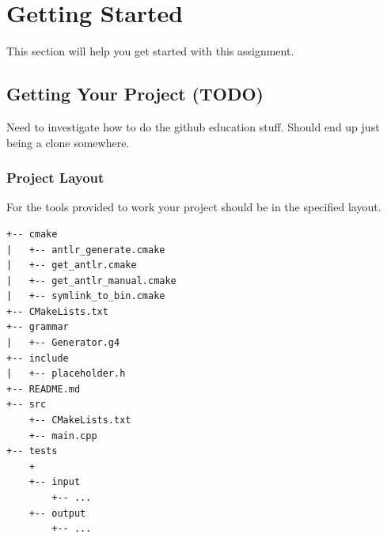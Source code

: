 \documentclass{article}
\begin{document}
\section{Getting Started}
This section will help you get started with this assignment.

\subsection{Getting Your Project (TODO)}
Need to investigate how to do the github education stuff. Should end up just being a clone
somewhere.

\subsubsection{Project Layout}
For the tools provided to work your project should be in the specified layout.
\begin{lstlisting}
+-- cmake
|   +-- antlr_generate.cmake
|   +-- get_antlr.cmake
|   +-- get_antlr_manual.cmake
|   +-- symlink_to_bin.cmake
+-- CMakeLists.txt
+-- grammar
|   +-- Generator.g4
+-- include
|   +-- placeholder.h
+-- README.md
+-- src
    +-- CMakeLists.txt
    +-- main.cpp
+-- tests
    +
    +-- input
        +-- ...
    +-- output
        +-- ...
\end{lstlisting}
\end{document}
